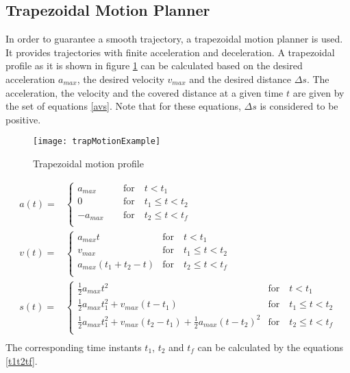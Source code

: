 \documentclass[a4paper, 11pt]{article}
\begin{document}
\subsection{Trapezoidal Motion Planner}
In order to guarantee a smooth trajectory, a trapezoidal motion planner is used. It provides trajectories with finite acceleration and deceleration. A trapezoidal profile as it is shown in figure \ref{fig:trapMotionExample} can be calculated based on the desired acceleration $a_{max}$, the desired velocity $v_{max}$ and the desired distance $\Delta s$. The acceleration, the velocity and the covered distance at a given time $t$ are given by the set of equations \eqref{avs}. Note that for these equations, $\Delta s$ is considered to be positive.
\begin{figure}[H]
	\centering
	\texttt{[image: trapMotionExample]}
	\caption{Trapezoidal motion profile}	
	\label{fig:trapMotionExample}	
\end{figure}
\noindent 
\begin{equation}
\label{avs}
\begin{split}
a(t) =
&\begin{cases}
a_{max} \qquad &\textrm{for} \quad t<t_1\\
0 		       &\textrm{for} \quad t_1\leq t<t_2\\
-a_{max} 	   &\textrm{for} \quad t_2 \leq t < t_f\\
\end{cases}\\
v(t) =
&\begin{cases}
a_{max}t \qquad &\textrm{for} \quad t<t_1\\
v_{max} 	      &\textrm{for} \quad t_1\leq t<t_2\\
a_{max}(t_1+t_2-t) 	   &\textrm{for} \quad t_2 \leq t < t_f\\
\end{cases}\\
s(t) =
&\begin{cases}
\frac{1}{2}a_{max}t^2 \qquad &\textrm{for} \quad t<t_1\\
\frac{1}{2}a_{max}t_1^2 + v_{max}(t-t_1)		       &\textrm{for} \quad t_1\leq t<t_2\\
\frac{1}{2}a_{max}t_1^2 + v_{max}(t_2-t_1) + \frac{1}{2}a_{max}(t-t_2)^2	   &\textrm{for} \quad t_2 \leq t < t_f\\
\end{cases}\\
\end{split}
\end{equation}
The corresponding time instants $t_1$, $t_2$ and $t_f$ can be calculated by the equations \eqref{t1t2tf}.
\end{document}
